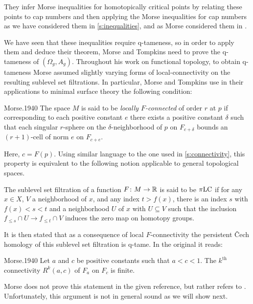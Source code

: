 They infer Morse inequalities for homotopically critical points by relating these points to cap numbers and then applying the Morse inequalities for cap numbers as we have considered them in \cref{s:inequalities}, and as Morse considered them in \cite{Morse.1940}.

We have seen that these inequalities require q-tameness, so in order to apply them and deduce their theorem, Morse and Tompkins need to prove the \mbox{q-tameness} of $(\Omega_g, A_g)$.
Throughout his work on functional topology, to obtain \mbox{q-tameness} Morse assumed slightly varying forms of local-connectivity on the resulting sublevel set filtrations.
In particular, Morse and Tompkins use in their applications to minimal surface theory the following condition:
\begin{displaycquote}[p.431]{Morse.1940}
	The space $M$ is said to be \textit{locally $F$-connected} of order $r$ at $p$ if corresponding to each positive constant $e$ there exists a positive constant $\delta$ such that each singular $r$-sphere on the $\delta$-neighborhood of $p$ on $F_{c+\delta}$ bounds an $(r+1)$-cell of norm $e$ on $F_{c+e}$.
\end{displaycquote}
Here, $c = F(p)$.
Using similar language to the one used in \cref{s:connectivity}, this property is equivalent to the following notion applicable to general topological spaces.

\begin{defi}
    The sublevel set filtration of a function $F \colon M \to \mathbb{R}$ is said to be $\pi\mathrm{LC}$	if for any $x \in X$, $V$ a neighborhood of $x$, and any index $t > f(x)$, there is an index $s$ with  $f(x) < s < t$ and a neighborhood $U$ of $x$ with $U \subseteq V$ such that the inclusion $f_{\leq s} \cap U \to f_{\leq t} \cap V$ induces the zero map on homotopy groups.
\end{defi}

It is then stated that as a consequence of local $F$-connectivity the persistent \v{C}ech homology of this sublevel set filtration is q-tame.
In the original it reads:

\begin{displaycquote}[Theorem 6.3, p.432]{Morse.1940}
	Let $a$ and $c$ be positive constants such that $a < c < 1$.
	The $k^{\mathrm{th}}$ connectivity $R^k(a,c)$ of $F_a$ on $F_c$ is finite.
\end{displaycquote}
Morse does not prove this statement in the given reference, but rather refers to \cite[Theorem~6.1]{Morse.1938}.
Unfortunately, this argument is not in general sound as we will show next.

